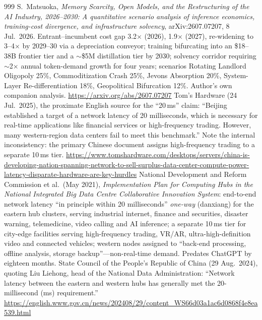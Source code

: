 \begin{thebibliography}{999}
 S.~Matsuoka, \emph{Memory Scarcity, Open Models, and the Restructuring of the AI Industry, 2026--2030: A quantitative scenario analysis of inference economics, training-cost divergence, and infrastructure solvency}, arXiv:2607.07207, 8 Jul.\ 2026. Entrant--incumbent cost gap 3.2$\times$ (2026), 1.9$\times$ (2027), re-widening to 3--4$\times$ by 2029--30 via a depreciation conveyor; training bifurcating into an \$18--38B frontier tier and a $\sim$\$5M distillation tier by 2030; solvency corridor requiring $\sim$2$\times$ annual token-demand growth for four years; scenarios Rotating Landlord Oligopoly 25\%, Commoditization Crash 25\%, Jevons Absorption 20\%, System-Layer Re-differentiation 18\%, Geopolitical Bifurcation 12\%. Author's own companion analysis. \url{https://arxiv.org/abs/2607.07207}
 Tom's Hardware (24 Jul.\ 2025), the proximate English source for the ``20\,ms'' claim: ``Beijing established a target of a network latency of 20 milliseconds, which is necessary for real-time applications like financial services or high-frequency trading. However, many western-region data centers fail to meet this benchmark.'' Note the internal inconsistency: the primary Chinese document assigns high-frequency trading to a separate 10\,ms tier. \url{https://www.tomshardware.com/desktops/servers/china-is-developing-nation-spanning-network-to-sell-surplus-data-center-compute-power-latency-disparate-hardware-are-key-hurdles}
 National Development and Reform Commission et al.\ (May 2021), \emph{Implementation Plan for Computing Hubs in the National Integrated Big Data Centre Collaborative Innovation System}: end-to-end network latency ``in principle within 20 milliseconds'' \emph{one-way} (danxiang) for the eastern hub clusters, serving industrial internet, finance and securities, disaster warning, telemedicine, video calling and AI inference; a separate 10\,ms tier for city-edge facilities serving high-frequency trading, VR/AR, ultra-high-definition video and connected vehicles; western nodes assigned to ``back-end processing, offline analysis, storage backup''---non-real-time demand. Predates ChatGPT by eighteen months.
 State Council of the People's Republic of China (29 Aug.\ 2024), quoting Liu Liehong, head of the National Data Administration: ``Network latency between the eastern and western hubs has generally met the 20-millisecond (ms) requirement.'' \url{https://english.www.gov.cn/news/202408/29/content_WS66d03a1ac6d0868f4e8ea539.html}

\end{thebibliography}
